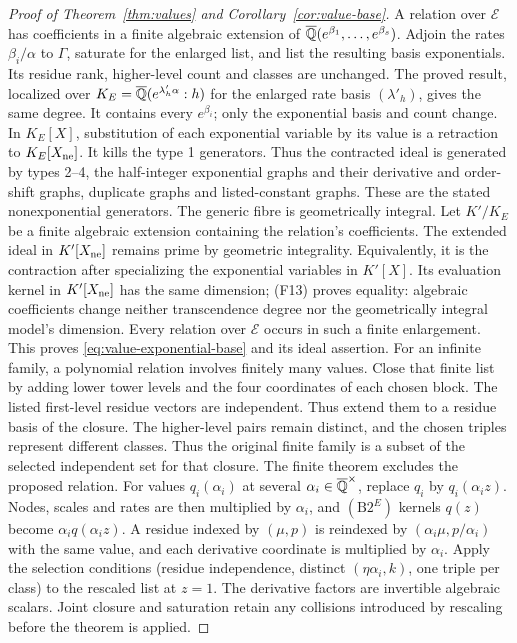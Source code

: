 \begin{proof}[Proof of Theorem~\ref{thm:values} and Corollary~\ref{cor:value-base}]
A relation over $\mathcal E$ has coefficients in a finite algebraic
extension of ${\overline{\mathbb{Q}}}(e^{\beta_1},\ldots,e^{\beta_s})$. Adjoin the rates
$\beta_i/\alpha$ to $\Gamma$, saturate for the enlarged list, and list
the resulting basis exponentials.
Its residue rank, higher-level count and classes are unchanged. The proved
result, localized over $K_E={\overline{\mathbb{Q}}}(e^{\lambda'_h\alpha}:h)$ for the
enlarged rate basis $(\lambda'_h)$, gives the same degree.
It contains every $e^{\beta_i}$; only the exponential basis and count change.
In $K_E[X]$, substitution of each exponential variable by its value is a
retraction to $K_E[X_{\rm ne}]$. It kills the type 1 generators. Thus the
contracted ideal is generated by types 2--4, the half-integer exponential
graphs and their derivative and order-shift graphs, duplicate graphs and
listed-constant graphs. These are the stated nonexponential generators. The generic fibre is
geometrically integral. Let $K'/K_E$ be a finite algebraic extension
containing the relation's coefficients. The extended ideal in
$K'[X_{\rm ne}]$ remains prime by geometric integrality. Equivalently,
it is the contraction after specializing the exponential variables in
$K'[X]$. Its evaluation kernel in $K'[X_{\rm ne}]$ has the same dimension;
(F13) proves equality: algebraic coefficients change neither transcendence
degree nor the geometrically integral model's dimension.
Every relation over $\mathcal E$ occurs in such a finite enlargement.
This proves \eqref{eq:value-exponential-base}
and its ideal assertion. For an infinite family, a polynomial relation involves finitely many values. Close that finite list by adding lower tower levels and the
four coordinates of each chosen block. The listed first-level residue
vectors are independent. Thus extend them to a residue basis of the closure.
The higher-level pairs remain distinct, and the chosen triples represent
different classes. Thus the original finite family is a subset of the
selected independent set for that closure. The finite theorem excludes
the proposed relation. For values $q_i(\alpha_i)$ at several $\alpha_i\in{\overline{\mathbb{Q}}}^\times$,
replace $q_i$ by $q_i(\alpha_i z)$. Nodes, scales and rates are then multiplied
by $\alpha_i$, and $(\mathrm{B2}^E)$ kernels $q(z)$ become
$\alpha_iq(\alpha_i z)$. A residue indexed by $(\mu,p)$ is
reindexed by $(\alpha_i\mu,p/\alpha_i)$ with the same value, and each derivative
coordinate is multiplied by $\alpha_i$. Apply the selection conditions
(residue independence, distinct $(\eta\alpha_i,k)$, one triple per class)
to the rescaled list at $z=1$. The derivative factors are invertible
algebraic scalars. Joint closure and saturation retain any collisions
introduced by rescaling before the theorem is applied.
\end{proof}

